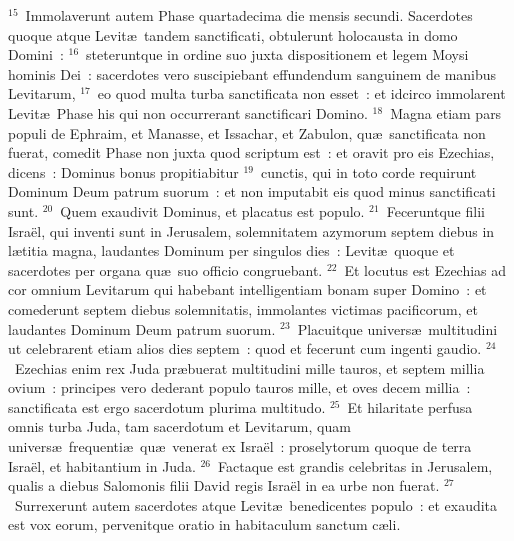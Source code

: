 ${}^{15}$~Immolaverunt autem Phase quartadecima die mensis secundi. Sacerdotes quoque atque Levit\ae\ tandem sanctificati, obtulerunt holocausta in domo Domini~:
${}^{16}$~steteruntque in ordine suo juxta dispositionem et legem Moysi hominis Dei~: sacerdotes vero suscipiebant effundendum sanguinem de manibus Levitarum,
${}^{17}$~eo quod multa turba sanctificata non esset~: et idcirco immolarent Levit\ae\ Phase his qui non occurrerant sanctificari Domino.
${}^{18}$~Magna etiam pars populi de Ephraim, et Manasse, et Issachar, et Zabulon, qu\ae\ sanctificata non fuerat, comedit Phase non juxta quod scriptum est~: et oravit pro eis Ezechias, dicens~: Dominus bonus propitiabitur
${}^{19}$~cunctis, qui in toto corde requirunt Dominum Deum patrum suorum~: et non imputabit eis quod minus sanctificati sunt.
${}^{20}$~Quem exaudivit Dominus, et placatus est populo.
${}^{21}$~Feceruntque filii Isra\"el, qui inventi sunt in Jerusalem, solemnitatem azymorum septem diebus in l\ae titia magna, laudantes Dominum per singulos dies~: Levit\ae\ quoque et sacerdotes per organa qu\ae\ suo officio congruebant.
${}^{22}$~Et locutus est Ezechias ad cor omnium Levitarum qui habebant intelligentiam bonam super Domino~: et comederunt septem diebus solemnitatis, immolantes victimas pacificorum, et laudantes Dominum Deum patrum suorum.
${}^{23}$~Placuitque univers\ae\ multitudini ut celebrarent etiam alios dies septem~: quod et fecerunt cum ingenti gaudio.
${}^{24}$~Ezechias enim rex Juda pr\ae buerat multitudini mille tauros, et septem millia ovium~: principes vero dederant populo tauros mille, et oves decem millia~: sanctificata est ergo sacerdotum plurima multitudo.
${}^{25}$~Et hilaritate perfusa omnis turba Juda, tam sacerdotum et Levitarum, quam univers\ae\ frequenti\ae\ qu\ae\ venerat ex Isra\"el~: proselytorum quoque de terra Isra\"el, et habitantium in Juda.
${}^{26}$~Factaque est grandis celebritas in Jerusalem, qualis a diebus Salomonis filii David regis Isra\"el in ea urbe non fuerat.
${}^{27}$~Surrexerunt autem sacerdotes atque Levit\ae\ benedicentes populo~: et exaudita est vox eorum, pervenitque oratio in habitaculum sanctum c\ae li.

